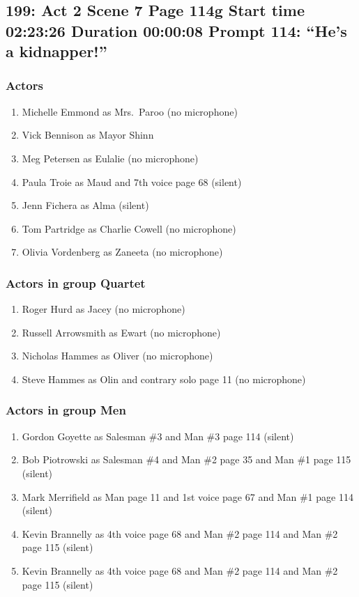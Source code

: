 \subsection{199: Act 2 Scene 7 Page 114g Start time 02:23:26 Duration 00:00:08 Prompt 114: ``He's a kidnapper!''}

\subsubsection{Actors}
\begin{enumerate}
\item Michelle Emmond as Mrs.~Paroo (no microphone)
\item Vick Bennison as Mayor Shinn
\item Meg Petersen as Eulalie (no microphone)
\item Paula Troie as Maud and 7th voice page 68 (silent)
\item Jenn Fichera as Alma (silent)
\item Tom Partridge as Charlie Cowell (no microphone)
\item Olivia Vordenberg as Zaneeta (no microphone)
\end{enumerate}
\subsubsection{Actors in group Quartet}
\begin{enumerate}
\item Roger Hurd as Jacey (no microphone)
\item Russell Arrowsmith as Ewart (no microphone)
\item Nicholas Hammes as Oliver (no microphone)
\item Steve Hammes as Olin and contrary solo page 11 (no microphone)
\end{enumerate}
\subsubsection{Actors in group Men}
\begin{enumerate}
\item Gordon Goyette as Salesman \#3 and Man \#3 page 114 (silent)
\item Bob Piotrowski as Salesman \#4 and Man \#2 page 35 and Man \#1 page 115 (silent)
\item Mark Merrifield as Man page 11 and 1st voice page 67 and Man \#1 page 114 (silent)
\item Kevin Brannelly as 4th voice page 68 and Man \#2 page 114 and Man \#2 page 115 (silent)
\item Kevin Brannelly as 4th voice page 68 and Man \#2 page 114 and Man \#2 page 115 (silent)
\end{enumerate}
